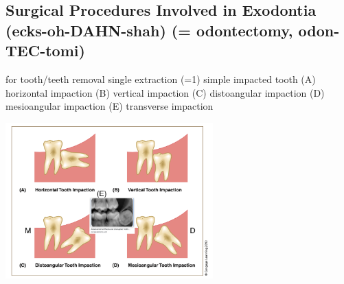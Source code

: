 \documentclass[
paper=landscape,
paper=160mm:90mm, %
fontsize=11pt, %
pagesize, %
parskip=half-, %
]{scrartcl} %
\theoremstyle{mythmstyle} %
\begin{document}
\clearpage
\subsection{Surgical Procedures Involved in Exodontia (ecks-oh-DAHN-shah) (= odontectomy, odon-TEC-tomi)}
 
\begin{minipage}[c]{0.45\linewidth}
\begin{outline}
\0 for tooth/teeth removal
\1 single extraction (=1)
\2 simple
\2 impacted tooth
    \3 (A) horizontal impaction
    \3 (B) vertical impaction
    \3 (C) distoangular impaction
    \3 (D) mesioangular impaction
    \3 (E) transverse impaction
\end{outline}

\end{minipage}
\begin{minipage}[c]{0.5\linewidth}

\includegraphics[width=8.0cm]{p258.png}
\end{minipage}

\clearpage
\end{document}
